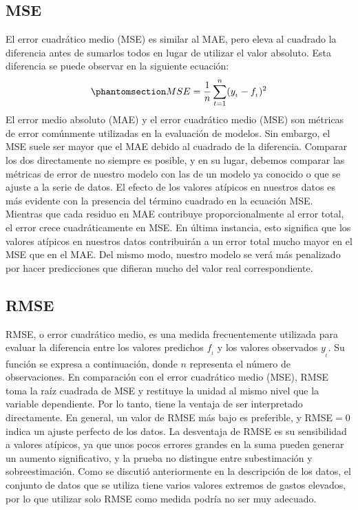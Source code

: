 \documentclass[
  us-letterpaper,
]{scrreprt}
\theoremstyle{definition}
\theoremstyle{plain}
\theoremstyle{plain}
\theoremstyle{definition}
\theoremstyle{remark}
\begin{document}
\subsection{MSE}\label{mse}

El error cuadrático medio (MSE) es similar al MAE, pero eleva al
cuadrado la diferencia antes de sumarlos todos en lugar de utilizar el
valor absoluto. Esta diferencia se puede observar en la siguiente
ecuación:
\begin{equation}\phantomsection\label{eq-MSE}{MSE=\frac{1}{n} \sum_{t=1}^n (y_{_t}-f_{_t})^2}\end{equation}
El error medio absoluto (MAE) y el error cuadrático medio (MSE) son
métricas de error comúnmente utilizadas en la evaluación de modelos. Sin
embargo, el MSE suele ser mayor que el MAE debido al cuadrado de la
diferencia. Comparar los dos directamente no siempre es posible, y en su
lugar, debemos comparar las métricas de error de nuestro modelo con las
de un modelo ya conocido o que se ajuste a la serie de datos. El efecto
de los valores atípicos en nuestros datos es más evidente con la
presencia del término cuadrado en la ecuación MSE. Mientras que cada
residuo en MAE contribuye proporcionalmente al error total, el error
crece cuadráticamente en MSE. En última instancia, esto significa que
los valores atípicos en nuestros datos contribuirán a un error total
mucho mayor en el MSE que en el MAE. Del mismo modo, nuestro modelo se
verá más penalizado por hacer predicciones que difieran mucho del valor
real correspondiente.

\subsection{RMSE}\label{rmse}

RMSE, o error cuadrático medio, es una medida frecuentemente utilizada
para evaluar la diferencia entre los valores predichos \(f_{_t}\) y los
valores observados \(y_{_t}\). Su función se expresa a continuación,
donde \(n\) representa el número de observaciones. En comparación con el
error cuadrático medio (MSE), RMSE toma la raíz cuadrada de MSE y
restituye la unidad al mismo nivel que la variable dependiente. Por lo
tanto, tiene la ventaja de ser interpretado directamente. En general, un
valor de RMSE más bajo es preferible, y RMSE\(=0\) indica un ajuste
perfecto de los datos. La desventaja de RMSE es su sensibilidad a
valores atípicos, ya que unos pocos errores grandes en la suma pueden
generar un aumento significativo, y la prueba no distingue entre
subestimación y sobreestimación. Como se discutió anteriormente en la
descripción de los datos, el conjunto de datos que se utiliza tiene
varios valores extremos de gastos elevados, por lo que utilizar solo
RMSE como medida podría no ser muy adecuado.
\end{document}

